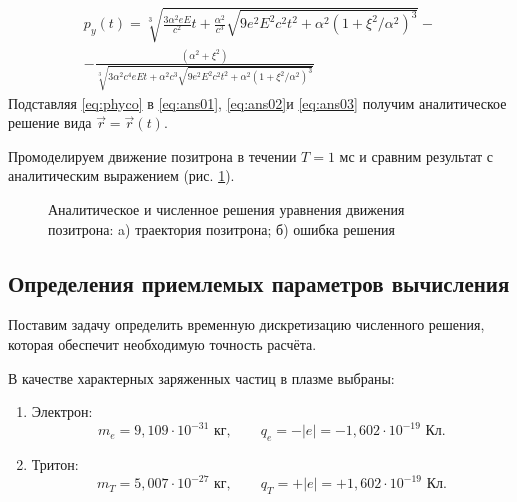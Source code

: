 \begin{multline}
p_y(t) = \sqrt[3]{\frac{3 \alpha^2 eE}{c^2}t + \frac{\alpha^2}{c^3} \sqrt{9 e^2 E^2c^2t^2 + \alpha^2  \left( 1 + \xi^2/\alpha^2  \right)^3  }} -\\-
\frac{ \left( \alpha^2 + \xi^2  \right)  }{\sqrt[3]{3 \alpha^2c^4 eEt + \alpha^2c^3 \sqrt{9 e^2 E^2c^2t^2 + \alpha^2   \left( 1 + \xi^2/\alpha^2  \right)^3  }}}
\label{eq:phyco}
\end{multline}
Подставляя \eqref{eq:phyco} в \eqref{eq:ans01}, \eqref{eq:ans02}и \eqref{eq:ans03} получим аналитическое решение вида $\vec{r} = \vec{r}(t)$.

Промоделируем движение позитрона в течении $T = 1 \text{ мс}$ и сравним результат с аналитическим выражением (рис. \ref{fig:xyz_EB}).


\begin{figure}[h]
	\begin{minipage}[h]{.70\linewidth}
	\end{minipage}
	\hfill
	\begin{minipage}[h]{.29\linewidth}
	\end{minipage}
	\caption{Аналитическое и численное решения уравнения движения позитрона: a) траектория позитрона; б) ошибка решения}
	\label{fig:xyz_EB}
\end{figure}


\subsection{Определения приемлемых параметров вычисления}


Поставим задачу определить временную дискретизацию  численного решения, которая обеспечит необходимую точность расчёта. 

В качестве характерных заряженных частиц в плазме выбраны:
\begin{enumerate}
\item Электрон:
\begin{equation*}
m_e = 9,109 \cdot 10^{-31} \text{ кг}, \qquad q_e = - |e| = - 1,602 \cdot 10^{-19} \text{ Кл}.
\end{equation*}

\item Тритон:
\begin{equation*}
m_T = 5,007 \cdot 10^{-27} \text{ кг}, \qquad q_T = + |e| = + 1,602 \cdot 10^{-19} \text{ Кл}.
\end{equation*}

\end{enumerate}

